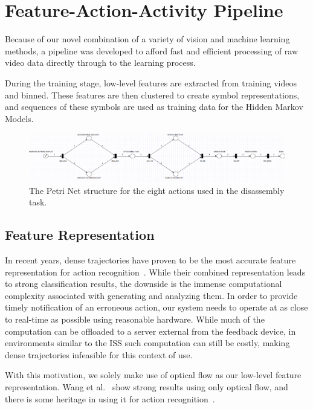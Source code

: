\documentclass[10pt,twocolumn,letterpaper]{article}
\begin{document}

\section{Feature-Action-Activity Pipeline}
Because of our novel combination of a variety of vision and machine learning methods, a pipeline was developed to afford fast and efficient processing of raw video data directly through to the learning process.

During the training stage, low-level features are extracted from training videos and binned. These features are then clustered to create symbol representations, and sequences of these symbols are used as training data for the Hidden Markov Models.

\begin{figure}[!tp]
    \centering
    \includegraphics[width=7.1in]{fig/petri.png}
    \caption{The Petri Net structure for the eight actions used in the disassembly task.}
    \label{fig:petri}
\end{figure}

\subsection{Feature Representation}
In recent years, dense trajectories have proven to be the most accurate feature representation for action recognition~\cite{wang2011action}. While their combined representation leads to strong classification results, the downside is the immense computational complexity associated with generating and analyzing them. In order to provide timely notification of an erroneous action, our system needs to operate at as close to real-time as possible using reasonable hardware. While much of the computation can be offloaded to a server external from the feedback device, in environments similar to the ISS such computation can still be costly, making dense trajectories infeasible for this context of use.

With this motivation, we solely make use of optical flow as our low-level feature representation. Wang et al.~\cite{wang2011action} show strong results using only optical flow, and there is some heritage in using it for action recognition~\cite{chaudhry2009histograms}.
\end{document}
